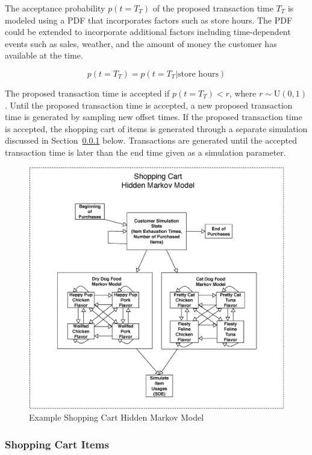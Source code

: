 \documentclass[conference]{IEEEtran}
\begin{document}
The acceptance probability $p(t=T_T)$ of the proposed transaction time $T_T$ is modeled using a PDF that incorporates factors such as store hours.  The PDF could be extended to incorporate additional factors including time-dependent events such as sales, weather, and the amount of money the customer has available at the time.

\begin{equation}
p(t=T_T) = p(t=T_T | \text{store hours})
\end{equation}

The proposed transaction time is accepted if $p(t=T_T) < r$, where $r \sim \text{U}(0, 1)$. Until the proposed transaction time is accepted, a new proposed transaction time is generated by sampling new offset times. If the proposed transaction time is accepted, the shopping cart of items is generated through a separate simulation discussed in Section~\ref{sec:transaction-purchases} below. Transactions are generated until the accepted transaction time is later than the end time given as a simulation parameter.

\begin{figure}[!t]
  \centering
  \includegraphics[width=6in]{figures/shopping_cart_simulation.eps}
  \caption{Example Shopping Cart Hidden Markov Model}
  \label{fig:shopping_cart_sim}
\end{figure}

\subsubsection{Shopping Cart Items} \label{sec:transaction-purchases}
\end{document}
